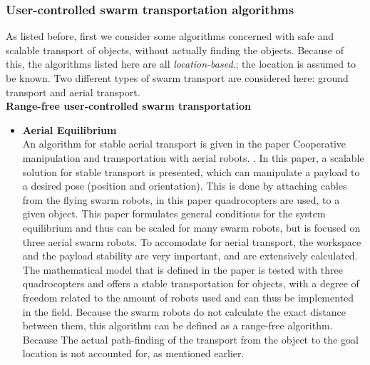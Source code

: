 \subsubsection{User-controlled swarm transportation algorithms}
As listed before, first we consider some algorithms concerned with safe and scalable transport of objects, without actually finding the objects. Because of this, the algorithms listed here are all \emph{location-based}.; the location is assumed to be known. 
Two different types of swarm transport are considered here: ground transport and aerial transport. \\

\textbf{Range-free user-controlled swarm transportation}
\begin{itemize}
\item \textbf{Aerial Equilibrium}\\
An algorithm for stable aerial transport is given in the paper Cooperative manipulation and transportation with aerial robots. \cite{Michael2011}. 
In this paper, a scalable solution for stable transport is presented, which can manipulate a payload to a desired pose (position and orientation).
This is done by attaching cables from the flying swarm robots, in this paper quadrocopters are used, to a given object. 
This paper formulates general conditions for the system equilibrium and thus can be scaled for many swarm robots, but is focused on three aerial swarm robots. 
To accomodate for aerial transport, the workspace and the payload stability are very important, and are extensively calculated. 
The mathematical model that is defined in the paper is tested with three quadrocopters and offers a stable transportation for objects, with a degree of freedom related to the amount of robots used and can thus be implemented in the field.
Because the swarm robots do not calculate the exact distance between them, this algorithm can be defined as a range-free algorithm. Because
The actual path-finding of the transport from the object to the goal location is not accounted for, as mentioned earlier.  \\
\end{itemize}


